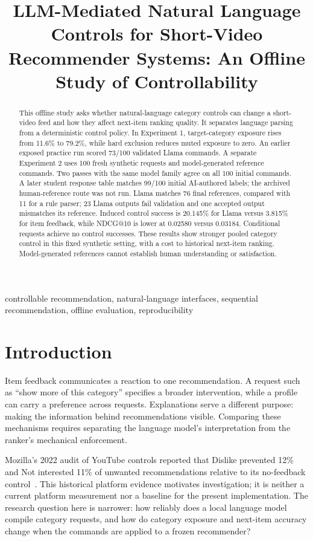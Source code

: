 \documentclass[conference]{IEEEtran}
\title{LLM-Mediated Natural Language Controls for Short-Video Recommender Systems: An Offline Study of Controllability}
\author{\IEEEauthorblockN{Vibhor Malik}\IEEEauthorblockA{M.Sc. in Applied Computing\\British Columbia Institute of Technology\\Supervisor: Borna Noureddin\\COMP 9500 Research Project\\20 October 2026}}
\begin{document}
\maketitle
\thispagestyle{plain}\pagestyle{plain}
\begin{abstract}
This offline study asks whether natural-language category controls can change a short-video feed and how they affect next-item ranking quality. It separates language parsing from a deterministic control policy. In Experiment 1, target-category exposure rises from 11.6\% to 79.2\%, while hard exclusion reduces muted exposure to zero. An earlier exposed practice run scored 73/100 validated Llama commands. A separate Experiment 2 uses 100 fresh synthetic requests and model-generated reference commands. Two passes with the same model family agree on all 100 initial commands. A later student response table matches 99/100 initial AI-authored labels; the archived human-reference route was not run. Llama matches 76 final references, compared with 11 for a rule parser; 23 Llama outputs fail validation and one accepted output mismatches its reference. Induced control success is 20.145\% for Llama versus 3.815\% for item feedback, while NDCG@10 is lower at 0.02580 versus 0.03184. Conditional requests achieve no control successes. These results show stronger pooled category control in this fixed synthetic setting, with a cost to historical next-item ranking. Model-generated references cannot establish human understanding or satisfaction.
\end{abstract}
\begin{IEEEkeywords}
controllable recommendation, natural-language interfaces, sequential recommendation, offline evaluation, reproducibility
\end{IEEEkeywords}

\section{Introduction}
Item feedback communicates a reaction to one recommendation. A request such as ``show more of this category'' specifies a broader intervention, while a profile can carry a preference across requests. Explanations serve a different purpose: making the information behind recommendations visible. Comparing these mechanisms requires separating the language model's interpretation from the ranker's mechanical enforcement.

Mozilla's 2022 audit of YouTube controls reported that Dislike prevented 12\% and Not interested 11\% of unwanted recommendations relative to its no-feedback control~\cite{ricks2022button}. This historical platform evidence motivates investigation; it is neither a current platform measurement nor a baseline for the present implementation. The research question here is narrower: how reliably does a local language model compile category requests, and how do category exposure and next-item accuracy change when the commands are applied to a frozen recommender?
\end{document}
